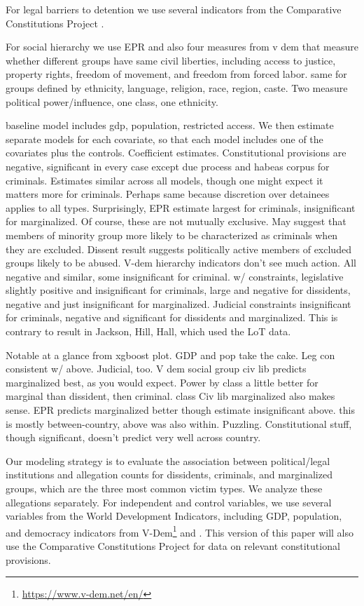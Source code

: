 \documentclass[11pt]{article}
\begin{document}
For legal barriers to detention we use several indicators from the Comparative Constitutions Project \citep{CCP2010}. 

For social hierarchy we use EPR and also four measures from v dem that measure whether different groups have same civil liberties, including access to justice, property rights, freedom of movement, and freedom from forced labor. same for groups defined by ethnicity, language, religion, race, region, caste. Two measure political power/influence, one class, one ethnicity. 

baseline model includes gdp, population, restricted access. We then estimate separate models for each covariate, so that each model includes one of the covariates plus the controls. Coefficient estimates. Constitutional provisions are negative, significant in every case except due process and habeas corpus for criminals. Estimates similar across all models, though one might expect it matters more for criminals. Perhaps same because discretion over detainees applies to all types. Surprisingly, EPR estimate largest for criminals, insignificant for marginalized. Of course, these are not mutually exclusive. May suggest that members of minority group more likely to be characterized as criminals when they are excluded. Dissent result suggests politically active members of excluded groups likely to be abused. V-dem hierarchy indicators don't see much action. All negative and similar, some insignificant for criminal. w/ constraints, legislative slightly positive and insignificant for criminals, large and negative for dissidents, negative and just insignificant for marginalized. Judicial constraints insignificant for criminals, negative and significant for dissidents and marginalized. This is contrary to result in Jackson, Hill, Hall, which used the LoT data.    

Notable at a glance from xgboost plot. GDP and pop take the cake. Leg con consistent w/ above. Judicial, too. V dem social group civ lib predicts marginalized best, as you would expect. Power by class a little better for marginal than dissident, then criminal. class Civ lib marginalized also makes sense. EPR predicts marginalized better though estimate insignificant above. this is mostly between-country, above was also within. Puzzling. Constitutional stuff, though significant, doesn't predict very well across country. 

Our modeling strategy is to evaluate the association between political/legal institutions and allegation counts for dissidents, criminals, and marginalized groups, which are the three most common victim types. We analyze these allegations separately. For independent and control variables, we use several variables from the World Development Indicators, including GDP, population, and democracy indicators from V-Dem\footnote{\url{https://www.v-dem.net/en/}} and \citet{cheibub2010democracy}. This version of this paper will also use the Comparative Constitutions Project for data on relevant constitutional provisions. 
\end{document}
